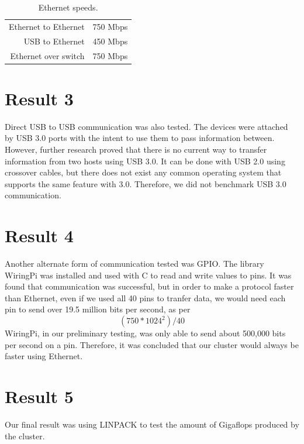 \begin{table}[tbh]
\caption{Ethernet speeds. \label{ethernet}}
\begin{center}
\begin{tabular}{|r|l|}
  \hline
  Ethernet to Ethernet & 750 Mbps \\
  USB to Ethernet &  450 Mbps \\ 
  Ethernet over switch & 750 Mbps \\
  \hline
\end{tabular}
\end{center}
\end{table}

\section{Result 3}

Direct USB to USB communication was also tested. The devices were attached by USB 3.0 ports with the intent to use them to pass information between. However, further research proved that there is no current way to transfer information from two hosts using USB 3.0. It can be done with USB 2.0 using crossover cables, but there does not exist any common operating system that supports the same feature with 3.0. Therefore, we did not benchmark USB 3.0 communication.

\section{Result 4}

Another alternate form of communication tested was GPIO. The library WiringPi was installed and used with C to read and write values to pins. It was found that communication was successful, but in order to make a protocol faster than Ethernet, even if we used all 40 pins to tranfer data, we would need each pin to send over 19.5 million bits per second, as per \begin{equation}(750 * 1024^{2}) / 40 \end{equation}WiringPi, in our preliminary testing, was only able to send about 500,000 bits per second on a pin. Therefore, it was concluded that our cluster would always be faster using Ethernet.

\section{Result 5}

Our final result was using LINPACK to test the amount of Gigaflops produced by the cluster. 

